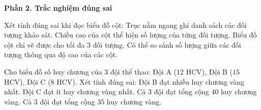 \textbf{Phần 2. Trắc nghiệm đúng sai}

\begin{ex} %
Xét tính đúng sai khi đọc biểu đồ cột:
\choiceTF
{\True Trục nằm ngang ghi danh sách các đối tượng khảo sát.}
{\True Chiều cao của cột thể hiện số lượng của từng đối tượng.}
{Biểu đồ cột chỉ vẽ được cho tối đa 3 đối tượng.}
{\True Có thể so sánh số lượng giữa các đối tượng thông qua độ cao của các cột.}
\end{ex}

\begin{ex} %
Cho biểu đồ số huy chương của 3 đội thể thao: Đội A ($12$ HCV), Đội B ($15$ HCV), Đội C ($8$ HCV). Xét tính đúng sai:
\choiceTF
{\True Đội B đạt nhiều huy chương vàng nhất.}
{\True Đội C đạt ít huy chương vàng nhất.}
{Cả 3 đội đạt tổng cộng $40$ huy chương vàng.}
{\True Cả 3 đội đạt tổng cộng $35$ huy chương vàng.}
\end{ex}


